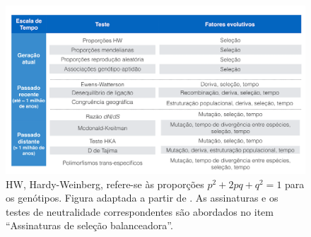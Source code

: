 \begin{refsection}
\begin{figure}
\includegraphics[width=\textwidth,keepaspectratio]{chap1_folder/Figures/hedrick_signatures_balsel_v2.png}
\caption{HW, Hardy-Weinberg, refere-se às proporções $p^2+2pq+q^2=1$ para os genótipos. Figura adaptada a partir de \textcite{Hedrick2012}. As assinaturas e os testes de neutralidade correspondentes são abordados no item \enquote{Assinaturas de seleção balanceadora}.}  %
\label{fig:TestesBS}
\end{figure}


\end{refsection}
